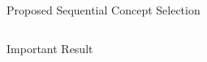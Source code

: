 \documentclass[final]{beamer}
\newlength{\onecolwid}
\newlength{\twocolwid}
\begin{document}
\begin{frame}[t]
\begin{columns}[t]
\begin{column}{\twocolwid}
\begin{alertblock}{Proposed Sequential Concept Selection}
\begin{tikzpicture}
\end{tikzpicture}

\end{alertblock}

\begin{columns}[t,totalwidth=\twocolwid] %

\begin{column}{\onecolwid}\vspace{-.6in} %




\end{column} %

\begin{column}{\onecolwid}\vspace{-.6in} %





\end{column} %

\end{columns} %




\begin{alertblock}{Important Result}



\end{alertblock} 



\end{column}
\end{columns}
\end{frame}
\end{document}
